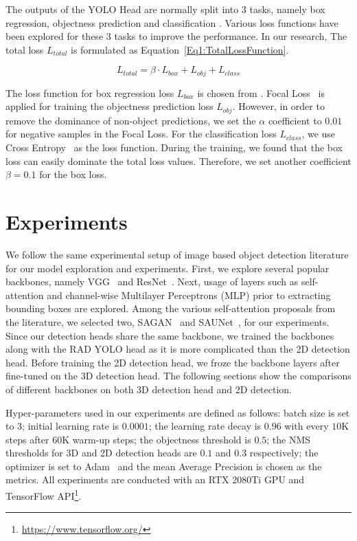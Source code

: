 \documentclass[10pt, conference, compsocconf]{IEEEtran}
\begin{document}
The outputs of the YOLO Head are normally split into $3$ tasks, namely box regression, objectness prediction and classification \cite{Ref:YOLOv4}. Various loss functions have been explored for these $3$ tasks to improve the performance. In our research, The total loss $L_{total}$ is formulated as Equation~\ref{Eq1:TotalLossFunction}.

\begin{equation}
	L_{total} = \beta \cdot L_{box} + L_{obj} + L_{class}
	\label{Eq1:TotalLossFunction}
\end{equation}

The loss function for box regression loss $L_{box}$ is chosen from \cite{Ref:YOLOv1}. Focal Loss~\cite{Ref:FocalLoss} is applied for training the objectness prediction loss $L_{obj}$. However, in order to remove the dominance of non-object predictions, we set the $\alpha$ coefficient to $0.01$ for negative samples in the Focal Loss. For the classification loss $L_{class}$, we use Cross Entropy~\cite{BG:CrossEntropy} as the loss function. During the training, we found that the box loss can easily dominate the total loss values. Therefore, we set another coefficient $\beta = 0.1$ for the box loss. 



\section{Experiments}


We follow the same experimental setup of image based object detection literature for our model exploration and experiments. First, we explore several popular backbones, namely VGG~\cite{BG:VGG} and ResNet~\cite{BG:ResNet}. Next, usage of layers such as self-attention and channel-wise Multilayer Perceptrons (MLP) prior to extracting bounding boxes are explored. Among the various self-attention proposals from the literature, we selected two, SAGAN~\cite{Ref:SAGAN} and SAUNet~\cite{Ref:SAUnet}, for our experiments. Since our detection heads share the same backbone, we trained the backbones along with the RAD YOLO head as it is more complicated than the 2D detection head. Before training the 2D detection head, we froze the backbone layers after fine-tuned on the 3D detection head. The following sections show the comparisons of different backbones on both 3D detection head and 2D detection.

Hyper-parameters used in our experiments are defined as follows: batch size is set to $3$; initial learning rate is $0.0001$; the learning rate decay is $0.96$ with every $10$K steps after $60$K warm-up steps; the objectness threshold is $0.5$; the NMS thresholds for 3D and 2D detection heads are $0.1$ and $0.3$ respectively; the optimizer is set to Adam~\cite{BG:Adam} and the mean Average Precision is chosen as the metrics. All experiments are conducted with an RTX 2080Ti GPU and TensorFlow API\footnote{\url{https://www.tensorflow.org/}}.
\end{document}
